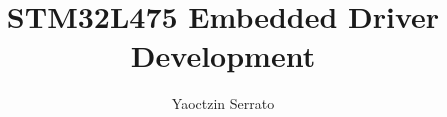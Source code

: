 \documentclass[
a4paper, %
11pt, %
onecolumn, %
openany, %
]{memoir}
\author{Yaoctzin Serrato}
\title{STM32L475 Embedded Driver Development}
\begin{document}
\frontmatter

\maketitle

\begin{abstract}
\lipsum[1-2]
\end{abstract}
\clearpage

\tableofcontents*
\clearpage

\mainmatter














% 
% 
\end{document}
